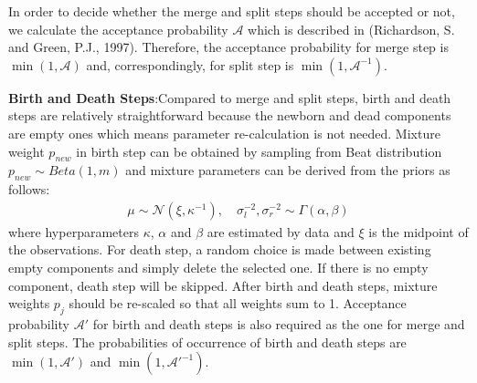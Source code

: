 \documentclass[conference]{IEEEtran}
\begin{document}
In order to decide whether the merge and split steps should be accepted or not, we calculate the acceptance probability $\mathcal{A}$ which is described in (Richardson, S. and Green, P.J., 1997)\cite{b1}. Therefore, the acceptance probability for merge step is $\min(1,\mathcal{A})$ and, correspondingly, for split step is $\min(1,\mathcal{A}^{-1})$.

\textbf{Birth and Death Steps}:Compared to merge and split steps, birth and death steps are relatively straightforward because the newborn and dead components are empty ones which means parameter re-calculation is not needed. Mixture weight $p_{new}$ in birth step can be obtained by sampling from Beat distribution $p_{new} \sim Beta(1,m)$ and mixture parameters can be derived from the priors as follows\cite{casella}:
\begin{align}
\mu \sim \mathcal{N}(\xi,\kappa^{-1}), \quad \sigma_{l}^{-2},\sigma_{r}^{-2} \sim \Gamma(\alpha,\beta)
\label{eq:prior}
\end{align}
where hyperparameters $\kappa$, $\alpha$ and $\beta$ are estimated by data and $\xi$ is the midpoint of the observations. For death step, a random choice is made between existing empty components and simply delete the selected one. If there is no empty component, death step will be skipped. After birth and death steps, mixture weights $p_j$ should be re-scaled so that all weights sum to 1. Acceptance probability $\mathcal{A}'$ for birth and death steps is also required as the one for merge and split steps. The probabilities of occurrence of birth and death steps are $\min(1,\mathcal{A}')$ and $\min(1,\mathcal{A}'^{-1})$\cite{b1}.
\end{document}
